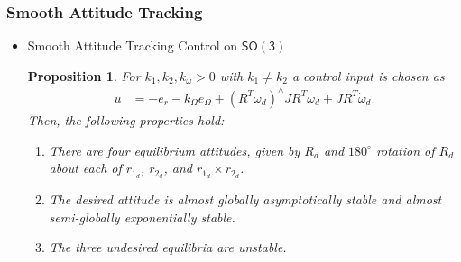 \documentclass[11pt,professionalfonts,hyperref={pdftex,pdfpagemode=none,pdfstartview=FitH}]{beamer}
\newcommand{\SO}{\ensuremath{\mathsf{SO(3)}}}
\newcommand{\T}{\ensuremath{\mathsf{T}}}
\renewcommand{\L}{\ensuremath{\mathsf{L}}}
\newcommand{\D}{\ensuremath{\mathbf{D}}}
\newtheorem{prop}{Proposition}
\begin{document}
%
%


\begin{frame}
\frametitle{Smooth Attitude Tracking}

\begin{itemize}
\item Smooth Attitude Tracking Control on $\SO$

\begin{prop}\label{prop:AGASSO}
For $k_1,k_2,k_\omega >0$ with $k_1\neq k_2$ a control input is chosen as
\begin{align*}
u & = -e_r -k_\Omega e_\Omega  +(R^T\omega_d)^\wedge JR^T\omega_d
+ JR^T\dot\omega_d.\label{eqn:uSO}
\end{align*}
Then, the following properties hold:
\begin{enumerate}
\item There are four equilibrium attitudes, given by $R_d$ and $180^\circ$ rotation of $R_d$ about each of $r_{1_d}$, $r_{2_d}$, and $r_{1_d}\times r_{2_d}$.
\item The desired attitude is almost globally asymptotically stable and almost semi-globally exponentially stable.
\item The three undesired equilibria are unstable.
\end{enumerate}
\end{prop}
\end{itemize}
\end{frame}
\end{document}
